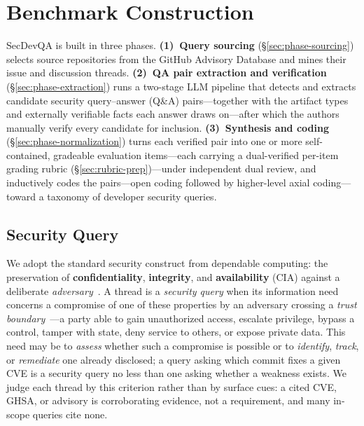\section{Benchmark Construction}
\label{sec:benchmark-construction}

SecDevQA is built in three phases. \textbf{(1)~Query sourcing}
(\S\ref{sec:phase-sourcing}) selects source repositories from the GitHub
Advisory Database and mines their issue and discussion threads.
\textbf{(2)~QA pair extraction and verification} (\S\ref{sec:phase-extraction})
runs a two-stage LLM pipeline that detects and extracts candidate security
query--answer (Q\&A) pairs---together with the artifact types and externally
verifiable facts each answer draws on---after which the authors
manually verify every candidate for inclusion. \textbf{(3)~Synthesis and
coding} (\S\ref{sec:phase-normalization}) turns each verified pair into one or
more self-contained, gradeable evaluation items---each carrying a dual-verified
per-item grading rubric (\S\ref{sec:rubric-prep})---under independent dual
review, and inductively codes the pairs---open coding followed by higher-level
axial coding---toward a taxonomy of developer security queries.



\subsection{Security Query}
\label{sec:security-def}

We adopt the standard security construct from dependable computing: the
preservation of \textbf{confidentiality}, \textbf{integrity}, and \textbf{availability} (CIA) against a
deliberate \emph{adversary}~\cite{avizienis2004taxonomy}. A thread is a
\emph{security query} when its information need concerns a compromise of one of
these properties by an adversary crossing a \emph{trust
boundary}~\cite{shostack2014threat}---a party able to gain unauthorized access,
escalate privilege, bypass a control, tamper with state, deny service to others,
or expose private data. This need may be to \emph{assess} whether such a
compromise is possible or to \emph{identify}, \emph{track}, or \emph{remediate}
one already disclosed; a query asking which commit fixes a given CVE is a
security query no less than one asking whether a weakness exists. We judge each
thread by this criterion rather than by surface cues: a cited CVE, GHSA, or
advisory is corroborating evidence, not a requirement, and many in-scope queries
cite none.

